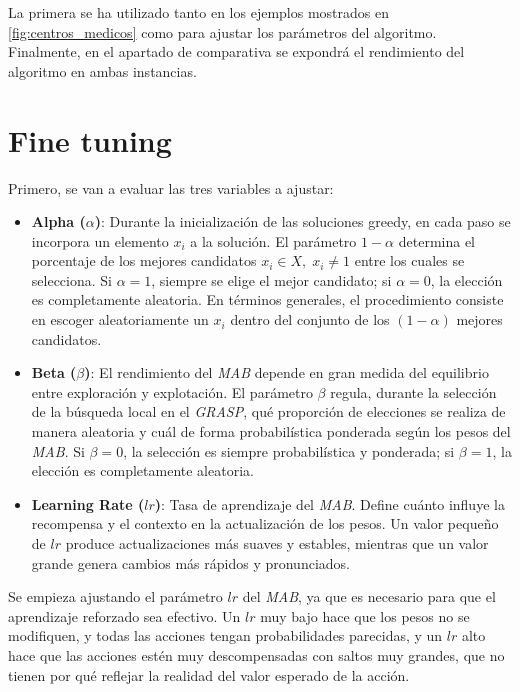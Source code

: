 \documentclass[12pt,a4paper]{book}
\begin{document}
La primera se ha utilizado tanto en los ejemplos mostrados en \ref{fig:centros_medicos} como para ajustar los parámetros del algoritmo. Finalmente, en el apartado de comparativa
se expondrá el rendimiento del algoritmo en ambas instancias.

\section{Fine tuning}

Primero, se van a evaluar las tres variables a ajustar:
\begin{itemize}
    \item \textbf{Alpha ($\alpha$)}: Durante la inicialización de las soluciones greedy, en cada paso se incorpora un elemento $x_i$ a la solución. El parámetro $1-\alpha$ determina el porcentaje de los mejores candidatos $x_i \in X, \; x_i \neq 1$ entre los cuales se selecciona.  
Si $\alpha = 1$, siempre se elige el mejor candidato; si $\alpha = 0$, la elección es completamente aleatoria. En términos generales, el procedimiento consiste en escoger aleatoriamente un $x_i$ dentro del conjunto de los $(1-\alpha)$ mejores candidatos.
    \item \textbf{Beta ($\beta$)}: El rendimiento del \textit{MAB} depende en gran medida del equilibrio entre exploración y explotación. El parámetro $\beta$ regula, durante la selección de la búsqueda local en el \textit{GRASP}, qué proporción de elecciones se realiza de manera aleatoria y cuál de forma probabilística ponderada según los pesos del \textit{MAB}.  
Si $\beta = 0$, la selección es siempre probabilística y ponderada; si $\beta = 1$, la elección es completamente aleatoria.
    \item \textbf{Learning Rate ($lr$)}: Tasa de aprendizaje del \textit{MAB}. Define cuánto influye la recompensa y el contexto en la actualización de los pesos. 
Un valor pequeño de $lr$ produce actualizaciones más suaves y estables, mientras que un valor grande genera cambios más rápidos y pronunciados.
\end{itemize}

Se empieza ajustando el parámetro $lr$ del \textit{MAB}, ya que es necesario para que el aprendizaje reforzado sea efectivo. Un $lr$ muy bajo hace que los pesos no se modifiquen, y todas las acciones tengan probabilidades parecidas, y un $lr$ alto hace que las acciones estén muy descompensadas con saltos muy grandes, que no tienen por qué reflejar la realidad del valor esperado de la acción.
\end{document}
